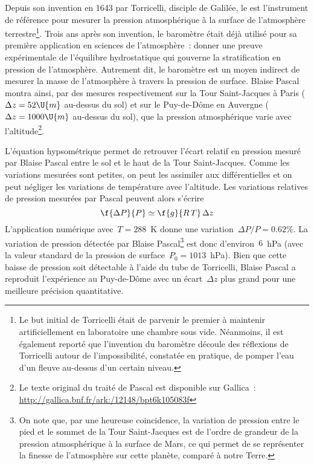 \sk
Depuis son invention en 1643 par Torricelli, disciple de Galilée, le  est l'instrument de référence pour mesurer la pression atmosphérique à la surface de l'atmosphère terrestre\footnote{Le but initial de Torricelli était de parvenir le premier à maintenir artificiellement en laboratoire une chambre sous vide. Néanmoins, il est également reporté que l'invention du baromètre découle des réflexions de Torricelli autour de l'impossibilité, constatée en pratique, de pomper l'eau d'un fleuve au-dessus d'un certain niveau.}. Trois ans après son invention, le baromètre était déjà utilisé pour sa première application en sciences de l'atmosphère~: donner une preuve expérimentale de l'équilibre hydrostatique qui gouverne la stratification en pression de l'atmosphère. Autrement dit, le baromètre est un moyen indirect de mesurer la masse de l'atmosphère à travers la pression de surface. Blaise Pascal montra ainsi, par des mesures respectivement sur la Tour Saint-Jacques à Paris ($ \Delta z = 52 \U{m} $ au-dessus du sol) et sur le Puy-de-Dôme en Auvergne ($ \Delta z = 1000 \U{m} $ au-dessus du sol), que la pression atmosphérique varie avec l'altitude\footnote{Le texte original du traité de Pascal est disponible sur Gallica~: \url{http://gallica.bnf.fr/ark:/12148/bpt6k105083f}}.

\sk
L'équation hypsométrique permet de retrouver l'écart relatif en pression mesuré par Blaise Pascal entre le sol et le haut de la Tour Saint-Jacques. Comme les variations mesurées sont petites, on peut les assimiler aux différentielles et on peut négliger les variations de température avec l'altitude. Les variations relatives de pression mesurées par Pascal peuvent alors s'écrire
\[ \f{\Delta P}{P} \simeq \f{g}{R\,T} \, \Delta z \]
L'application numérique avec~$T = 288$~K donne une variation~$\Delta P / P = 0.62 \%$. La variation de pression détectée par Blaise Pascal\footnote{On note que, par une heureuse coincidence, la variation de pression entre le pied et le sommet de la Tour Saint-Jacques est de l'ordre de grandeur de la pression atmosphérique à la surface de Mars, ce qui permet de se représenter la finesse de l'atmosphère sur cette planète, comparé à notre Terre.} est donc d'environ~$6$~hPa (avec la valeur standard de la pression de surface~$P_0 = 1013$~hPa). Bien que cette baisse de pression soit détectable à l'aide du tube de Torricelli, Blaise Pascal a reproduit l'expérience au Puy-de-Dôme avec un écart~$\Delta z$ plus grand pour une meilleure précision quantitative. 

